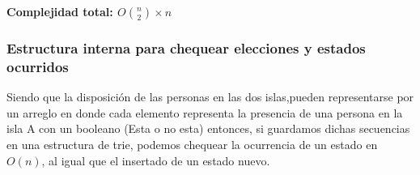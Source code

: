 \begin{algorithm}[H]
\textbf{\hfill Complejidad total: $O\binom{n}{2} \times n$}\\ 
\end{algorithm}


\subsubsection{Estructura interna para chequear elecciones y estados ocurridos}

Siendo que la disposici\'on de las personas en las dos islas,pueden representarse por un arreglo en donde cada elemento representa la presencia de una persona en la isla A con un booleano (Esta o no esta) entonces, si guardamos dichas secuencias en una estructura de trie, podemos chequear la ocurrencia de un estado en $O(n)$, al igual que el insertado de un estado nuevo.\\

